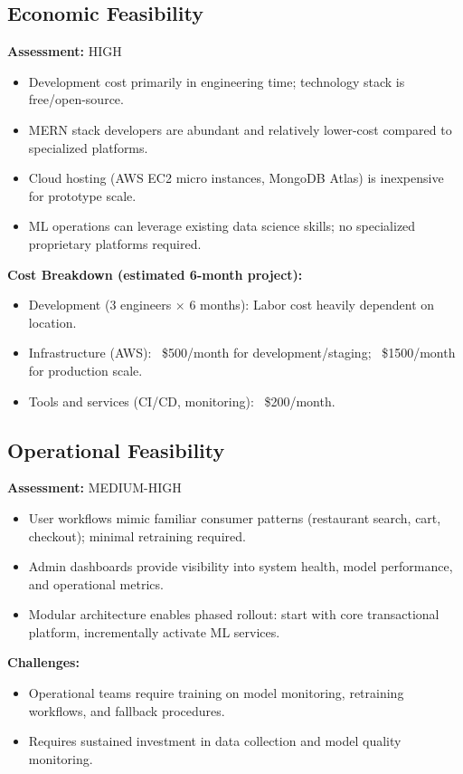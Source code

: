 \documentclass[12pt,a4paper]{report}
\begin{document}
\subsection{Economic Feasibility}

\textbf{Assessment:} HIGH

\begin{itemize}
    \item Development cost primarily in engineering time; technology stack is free/open-source.
    \item MERN stack developers are abundant and relatively lower-cost compared to specialized platforms.
    \item Cloud hosting (AWS EC2 micro instances, MongoDB Atlas) is inexpensive for prototype scale.
    \item ML operations can leverage existing data science skills; no specialized proprietary platforms required.
\end{itemize}

\textbf{Cost Breakdown (estimated 6-month project):}
\begin{itemize}
    \item Development (3 engineers × 6 months): Labor cost heavily dependent on location.
    \item Infrastructure (AWS): ~\$500/month for development/staging; ~\$1500/month for production scale.
    \item Tools and services (CI/CD, monitoring): ~\$200/month.
\end{itemize}

\subsection{Operational Feasibility}

\textbf{Assessment:} MEDIUM-HIGH

\begin{itemize}
    \item User workflows mimic familiar consumer patterns (restaurant search, cart, checkout); minimal retraining required.
    \item Admin dashboards provide visibility into system health, model performance, and operational metrics.
    \item Modular architecture enables phased rollout: start with core transactional platform, incrementally activate ML services.
\end{itemize}

\textbf{Challenges:}
\begin{itemize}
    \item Operational teams require training on model monitoring, retraining workflows, and fallback procedures.
    \item Requires sustained investment in data collection and model quality monitoring.
\end{itemize}
\end{document}
